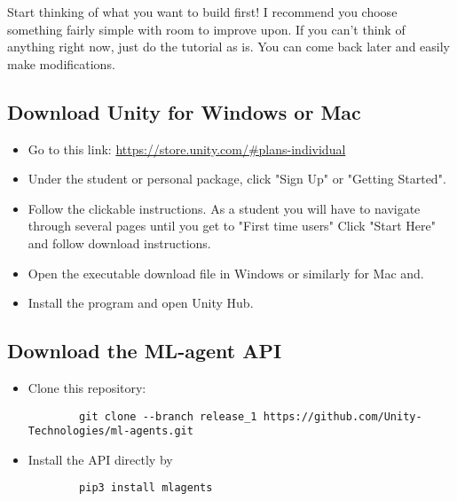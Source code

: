 \documentclass[11pt,fleqn,openany]{book} %
\begin{document}
\begin{remark}
 Start thinking of what you want to build first! I recommend you choose something fairly simple with room to improve upon. If you can't think of anything right now, just do the tutorial as is. You can  come back later and easily make modifications.
\end{remark}

\subsection{Download Unity for Windows or Mac}
\begin{itemize}
    \item Go to this link: \href{https://store.unity.com/#plans-individual}{https://store.unity.com/#plans-individual}
    \item Under the student or personal package, click "Sign Up" or "Getting Started".
    \item Follow the clickable instructions. As a student you will have to navigate through several pages until you get to "First time users" Click "Start Here" and follow download instructions.
    \item Open the executable download file in Windows or similarly for Mac and.
    \item Install the program and open Unity Hub.
\end{itemize} 

\subsection{Download the ML-agent API}
\begin{itemize}
    \item Clone this repository: \begin{verbatim}
        git clone --branch release_1 https://github.com/Unity-Technologies/ml-agents.git
    \end{verbatim}
    \item Install the API directly by \begin{verbatim}
        pip3 install mlagents
    \end{verbatim}
\end{itemize}
\end{document}
